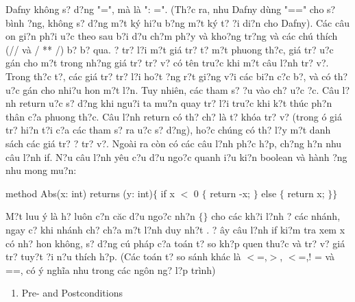 \documentclass{article} %
\begin{document}
  Dafny kh\^{o}ng s? d?ng "=", m\`{a} l\`{a} ": =". (Th?c ra, nhu Dafny d\`{u}ng "==" cho s? b\`{i}nh {\dj}?ng, kh\^{o}ng s? d?ng m?t k\'{y} hi?u b?ng m?t k\'{y} t? {\dj}?i di?n cho Dafny). C\'{a}c c\^{a}u {\dj}on gi?n ph?i {\dj}u?c theo sau b?i d?u ch?m ph?y v\`{a} kho?ng tr?ng v\`{a} c\'{a}c ch\'{u} th\'{i}ch (// v\`{a} / ** /) b? b? qua. {\DJ}? tr? l?i m?t gi\'{a} tr? t? m?t phuong th?c, gi\'{a} tr? {\dj}u?c g\'{a}n cho m?t trong nh?ng gi\'{a} tr? tr? v? c\'{o} t\^{e}n tru?c khi m?t c\^{a}u l?nh tr? v?. Trong th?c t?, c\'{a}c gi\'{a} tr? tr? l?i ho?t {\dj}?ng r?t gi?ng v?i c\'{a}c bi?n c?c b?, v\`{a} c\'{o} th? {\dj}u?c g\'{a}n cho nhi?u hon m?t l?n. Tuy nhi\^{e}n, c\'{a}c tham s? {\dj}?u v\`{a}o ch? {\dj}u?c {\dj}?c. C\^{a}u l?nh return {\dj}u?c s? d?ng khi ngu?i ta mu?n quay tr? l?i tru?c khi k?t th\'{u}c ph?n th\^{a}n c?a phuong th?c. C\^{a}u l?nh return c\'{o} th? ch? l\`{a} t? kh\'{o}a tr? v? (trong {\dj}\'{o} gi\'{a} tr? hi?n t?i c?a c\'{a}c tham s? ra {\dj}u?c s? d?ng), ho?c ch\'{u}ng c\'{o} th? l?y m?t danh s\'{a}ch c\'{a}c gi\'{a} tr? {\dj}? tr? v?. Ngo\`{a}i ra c\`{o}n c\'{o} c\'{a}c c\^{a}u l?nh ph?c h?p, ch?ng h?n nhu c\^{a}u l?nh if. N?u c\^{a}u l?nh y\^{e}u c?u d?u ngo?c quanh {\dj}i?u ki?n boolean v\`{a} h\`{a}nh {\dj}?ng nhu mong mu?n:

\noindent method Abs(x: int) returns (y: int)$\{$   if x $<$ 0      $\{$ return -x; $\}$   else      $\{$ return x; $\}$$\}$

M?t luu \'{y} l\`{a} h? lu\^{o}n c?n c\u{a}c d?u ngo?c nh?n $\{$$\}$ cho c\'{a}c kh?i l?nh ? c\'{a}c nh\'{a}nh, ngay c? khi nh\'{a}nh ch? ch?a m?t l?nh duy nh?t . ? {\dj}\^{a}y c\^{a}u l?nh if ki?m tra xem x c\'{o} nh? hon kh\^{o}ng, s? d?ng c\'{u} ph\'{a}p c?a to\'{a}n t? so kh?p quen thu?c v\`{a} tr? v? gi\'{a} tr? tuy?t {\dj}?i n?u th\'{i}ch h?p. (C\'{a}c to\'{a}n t? so s\'{a}nh kh\'{a}c l\`{a} $<$=,$>$, $<$=,! = v\`{a} ==, c\'{o} \'{y} ngh\~{i}a nhu trong c\'{a}c ng\^{o}n ng? l?p tr\`{i}nh)



\begin{enumerate}
\item  Pre- and Postconditions
\end{enumerate}
\end{document}
